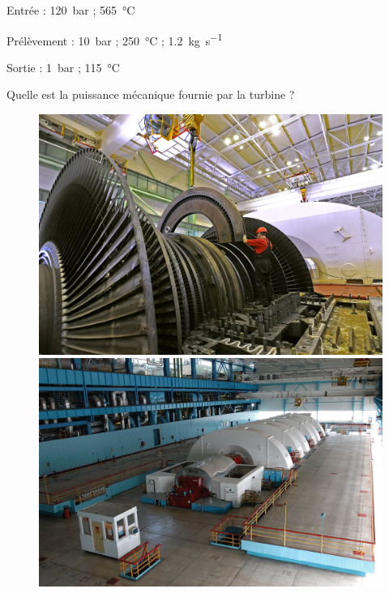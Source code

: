 	\begin{description}
		\item Entrée : 		\tab\SI{120}{\bar} ; 	\SI{565}{\degreeCelsius}
		\item Prélèvement : 	\tab\SI{10}{\bar} ; 	\SI{250}{\degreeCelsius} ;	\SI{1,2}{\kilogram\per\second}
		\item Sortie : 		\tab\SI{1}{\bar} ;		\SI{115}{\degreeCelsius}
	\end{description}

	Quelle est la puissance mécanique fournie par la turbine ?

	\begin{figure}
		\begin{center}
			\includegraphics[width=\columnwidth]{images/exercice_turbine_centrale2.jpg}
			\includegraphics[width=\columnwidth]{images/exercice_turbine_centrale1.jpg}
		\end{center}
		\label{fig_centrale_balakovo}
	\end{figure}

